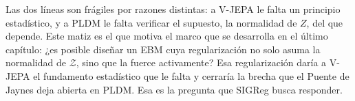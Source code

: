 Las dos líneas son frágiles por razones distintas: a V-JEPA le falta un principio estadístico, y a PLDM le falta verificar el supuesto, la normalidad de $Z$, del que depende. Este matiz es el que motiva el marco que se desarrolla en el último capítulo: ¿es posible diseñar un EBM cuya regularización no solo asuma la normalidad de $\mathcal{Z}$, sino que la fuerce activamente? Esa regularización daría a V-JEPA el fundamento estadístico que le falta y cerraría la brecha que el Puente de Jaynes deja abierta en PLDM. Esa es la pregunta que SIGReg busca responder.